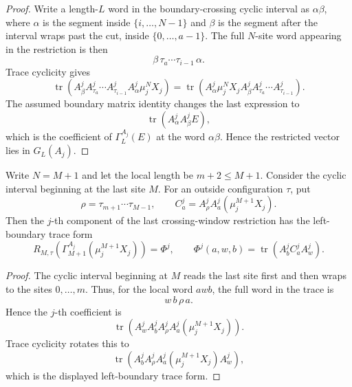 \begin{proof}
    \leanok
    Write a length-\(L\) word in the boundary-crossing cyclic interval as
    \(\alpha\beta\), where \(\alpha\) is the segment inside
    \(\{i,\ldots,N-1\}\) and \(\beta\) is the segment after the interval wraps
    past the cut, inside \(\{0,\ldots,a-1\}\). The full
    \(N\)-site word appearing in the restriction is then
    \[
        \beta\,\tau_a\cdots\tau_{i-1}\,\alpha .
    \]
    Trace cyclicity gives
    \[
        \operatorname{tr}\!\left(
        A^j_\beta A^j_{\tau_a}\cdots A^j_{\tau_{i-1}}
        A^j_\alpha \mu_j^NX_j\right)
        =
        \operatorname{tr}\!\left(
        A^j_\alpha \mu_j^NX_j A^j_\beta
        A^j_{\tau_a}\cdots A^j_{\tau_{i-1}}\right).
    \]
    The assumed boundary matrix identity changes the last expression to
    \[
        \operatorname{tr}\!\left(A^j_\alpha A^j_\beta E\right),
    \]
    which is the coefficient of \(\Gamma_L^{A_j}(E)\) at the word
    \(\alpha\beta\). Hence the restricted vector lies in \(G_L(A_j)\).
\end{proof}

\begin{lemma}
    \label{lem:block_diagonal_last_crossing_component_trace_form}
    \leanok
    Write \(N=M+1\) and let the local length be \(m+2\le M+1\). Consider the
    cyclic interval beginning at the last site \(M\). For an outside
    configuration \(\tau\), put
    \[
        \rho=\tau_{m+1}\cdots\tau_{M-1},
        \qquad
        C^j_a=A^j_\rho A^j_a(\mu_j^{M+1}X_j).
    \]
    Then the \(j\)-th component of the last crossing-window restriction has
    the left-boundary trace form
    \[
        R_{M,\tau}\!\left(\Gamma_{M+1}^{A_j}(\mu_j^{M+1}X_j)\right)
        =
        \Phi^j,
        \qquad
        \Phi^j(a,w,b)=\operatorname{tr}\!\left(A^j_b C^j_a A^j_w\right).
    \]
\end{lemma}

\begin{proof}
    \leanok
    The cyclic interval beginning at \(M\) reads the last site first and then
    wraps to the sites \(0,\ldots,m\). Thus, for the local word \(awb\), the
    full word in the trace is
    \[
        w\,b\,\rho\,a .
    \]
    Hence the \(j\)-th coefficient is
    \[
        \operatorname{tr}\!\left(A^j_wA^j_bA^j_\rho A^j_a
        (\mu_j^{M+1}X_j)\right).
    \]
    Trace cyclicity rotates this to
    \[
        \operatorname{tr}\!\left(
        A^j_bA^j_\rho A^j_a(\mu_j^{M+1}X_j)A^j_w\right),
    \]
    which is the displayed left-boundary trace form.
\end{proof}


